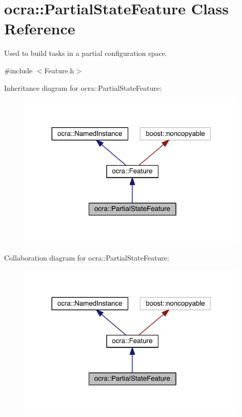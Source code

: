 \hypertarget{classocra_1_1PartialStateFeature}{}\section{ocra\+:\+:Partial\+State\+Feature Class Reference}
\label{classocra_1_1PartialStateFeature}


Used to build tasks in a partial configuration space.  




{\ttfamily \#include $<$Feature.\+h$>$}



Inheritance diagram for ocra\+:\+:Partial\+State\+Feature\+:\nopagebreak
\begin{figure}[H]
\begin{center}
\leavevmode
\includegraphics[width=312pt]{d2/d88/classocra_1_1PartialStateFeature__inherit__graph}
\end{center}
\end{figure}


Collaboration diagram for ocra\+:\+:Partial\+State\+Feature\+:\nopagebreak
\begin{figure}[H]
\begin{center}
\leavevmode
\includegraphics[width=312pt]{d0/d24/classocra_1_1PartialStateFeature__coll__graph}
\end{center}
\end{figure}
